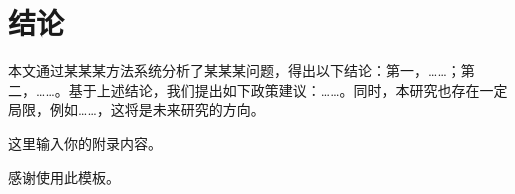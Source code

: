\documentclass[12pt,openright]{book}
\begin{document}
\chapter{结论}

本文通过某某某方法系统分析了某某某问题，得出以下结论：第一，……；第二，……。基于上述结论，我们提出如下政策建议：……。同时，本研究也存在一定局限，例如……，这将是未来研究的方向。

\NKTappendix
这里输入你的附录内容。



\begin{zhixie}
感谢使用此模板。
\end{zhixie}
\end{document}
